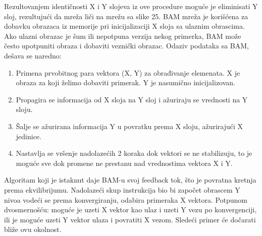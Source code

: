 \documentclass[fontsize=11bp, paper=a4]{scrarticle}
\begin{document}
Rezultovanjem identičnosti X i Y slojeva iz ove procedure moguće je eliminisati Y sloj, rezultujući da mreža liči na mrežu sa slike 25. BAM mreža je korišćena za dobavku obrazaca iz memorije pri inicijalizaciji X sloja sa ulaznim obrascima. Ako ulazni obrazac je šum ili nepotpuna verzija nekog primerka, BAM može često upotpuniti obraza i dobaviti veznički obrazac. Odaziv podataka sa BAM, dešava se naredno:
\begin{enumerate}
    \item Primena prvobitnog para vektora (X, Y) za obrađivanje elemenata. X je obraza za koji želimo dobaviti primerak. Y je nasumično inicijalizovan.
    \item Propagira se informacija od X sloja na Y sloj i ažuriraju se vrednosti na Y sloju.
    \item Šalje se ažurirana informacija Y u povratku prema X sloju, ažurirajući X jedinice.
    \item Nastavlja se vršenje nadolazećih 2 koraka dok vektori se ne stabilizuju, to je moguće sve dok promene ne prestanu nad vrednostima vektora X i Y.
\end{enumerate}
Algoritam koji je istaknut daje BAM-u svoj feedback tok, što je povratna kretnja prema ekvilibrijumu. Nadolazeći skup instrukcija bio bi započet obrascem Y nivoa vodeći se prema konvergiranju, odabira primeraka X vektora. Potpunom dvosmernošću: moguće je uzeti X vektor kao ulaz i uzeti Y vezu po konvergenciji, ili je moguće uzeti Y vektor ulaza i povratiti X vezom. Sledeći primer će dočarati bliže ovu okolnost.
\end{document}
